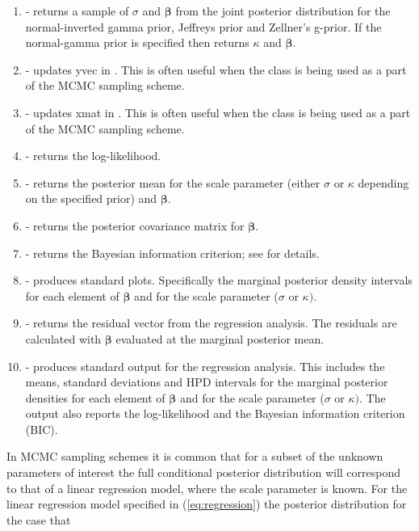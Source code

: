 \documentclass[article]{jss}
\begin{document}
\begin{enumerate}
\item {} - returns a sample of $\sigma$ and $\bm{\beta}$
  from the joint posterior distribution for the normal-inverted gamma
  prior, Jeffreys prior and Zellner's g-prior. If the normal-gamma
  prior is specified then  returns $\kappa$ and
  $\bm{\beta}.$
\item {} - updates yvec in . This
  is often useful when the class is being used as a part of the MCMC
  sampling scheme.
\item {} - updates xmat in . This
  is often useful when the class is being used as a part of the MCMC
  sampling scheme.
\item {} - returns the log-likelihood.
\item {} - returns the posterior mean for the scale parameter
(either $\sigma$ or $\kappa$ depending on the specified prior) and
$\bm{\beta}.$
\item {} - returns the posterior covariance matrix
for $\bm{\beta}$.
\item {} - returns the Bayesian information criterion; see \cite{KassRaftery1995} for details.
\item {} - produces standard plots. Specifically the
  marginal posterior density intervals for each element of
  $\bm{\beta}$ and for the scale parameter ($\sigma$ or $\kappa)$.
\item {} - returns the residual vector from the regression
  analysis.  The residuals are calculated with $\bm{\beta}$ evaluated
  at the marginal posterior mean.
\item {} - produces standard output for the regression analysis.
  This includes the means, standard deviations and HPD intervals for
  the marginal posterior densities for each element of $\bm{\beta}$
  and for the scale parameter ($\sigma$ or $\kappa)$. The output also
  reports the log-likelihood and the Bayesian information criterion
  (BIC).
\end{enumerate}
In MCMC sampling schemes it is common that for a subset of the unknown
parameters of interest the full conditional posterior distribution
will correspond to that of a linear regression model, where the scale
parameter is known. For the linear regression model specified in
(\ref{eq:regression}) the posterior distribution for the case that
\end{document}
